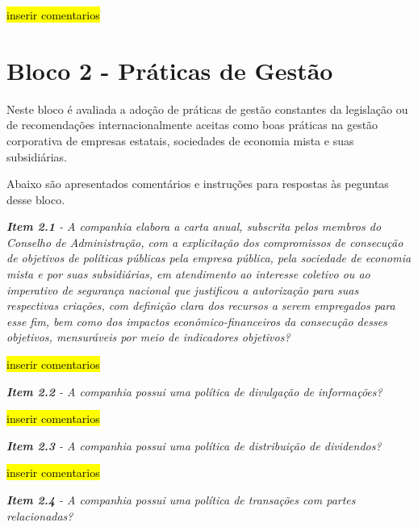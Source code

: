 \hl{inserir comentarios}

\section{Bloco 2 - Práticas de Gestão}
Neste bloco é avaliada a adoção de práticas de gestão constantes da legislação ou de recomendações internacionalmente aceitas como boas práticas na gestão corporativa de empresas estatais, sociedades de economia mista e suas subsidiárias.

Abaixo são apresentados comentários e instruções para respostas às peguntas desse bloco.

\vspace

\begin{framed}
\noindent\textit{\textbf{Item 2.1} - A companhia elabora a carta anual, subscrita pelos membros do Conselho de Administração, com a explicitação dos compromissos de consecução de objetivos de políticas públicas pela empresa pública, pela sociedade de economia mista e por suas subsidiárias, em atendimento ao interesse coletivo ou ao imperativo de segurança nacional que justificou a autorização para suas respectivas criações, com definição clara dos recursos a serem empregados para esse fim, bem como dos impactos econômico-financeiros da consecução desses objetivos, mensuráveis por meio de indicadores objetivos?}
\end{framed}

\hl{inserir comentarios}

\begin{framed}
\noindent\textit{\textbf{Item 2.2} - A companhia possui uma política de divulgação de informações?}
\end{framed}

\hl{inserir comentarios}

\begin{framed}
\noindent\textit{\textbf{Item 2.3} - A companhia possui uma política de distribuição de dividendos?}
\end{framed}

\hl{inserir comentarios}

\begin{framed}
\noindent\textit{\textbf{Item 2.4} - A companhia possui uma política de transações com partes relacionadas?}
\end{framed}

